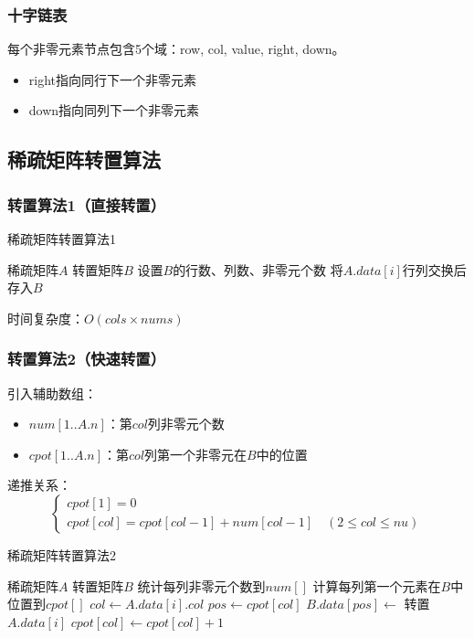 \documentclass[12pt,a4paper]{amsart}
\begin{document}
\subsubsection{十字链表}

每个非零元素节点包含5个域：row, col, value, right, down。
\begin{itemize}
\item right指向同行下一个非零元素
\item down指向同列下一个非零元素
\end{itemize}

\subsection{稀疏矩阵转置算法}

\subsubsection{转置算法1（直接转置）}

\begin{algorithm}
\caption{稀疏矩阵转置算法1}
\begin{algorithmic}[1]
\REQUIRE 稀疏矩阵$A$
\ENSURE 转置矩阵$B$
\STATE 设置$B$的行数、列数、非零元个数
            \STATE 将$A.data[i]$行列交换后存入$B$
        \ENDIF
    \ENDFOR
\ENDFOR
\end{algorithmic}
\end{algorithm}

时间复杂度：$O(cols \times nums)$

\subsubsection{转置算法2（快速转置）}

引入辅助数组：
\begin{itemize}
\item $num[1..A.n]$：第$col$列非零元个数
\item $cpot[1..A.n]$：第$col$列第一个非零元在$B$中的位置
\end{itemize}

递推关系：
$$\begin{cases}
cpot[1] = 0 \\
cpot[col] = cpot[col-1] + num[col-1] \quad (2 \leq col \leq nu)
\end{cases}$$

\begin{algorithm}
\caption{稀疏矩阵转置算法2}
\begin{algorithmic}[1]
\REQUIRE 稀疏矩阵$A$
\ENSURE 转置矩阵$B$
\STATE 统计每列非零元个数到$num[]$
\STATE 计算每列第一个元素在$B$中位置到$cpot[]$
    \STATE $col \leftarrow A.data[i].col$
    \STATE $pos \leftarrow cpot[col]$
    \STATE $B.data[pos] \leftarrow$ 转置$A.data[i]$
    \STATE $cpot[col] \leftarrow cpot[col] + 1$
\ENDFOR
\end{algorithmic}
\end{algorithm}
\end{document}
